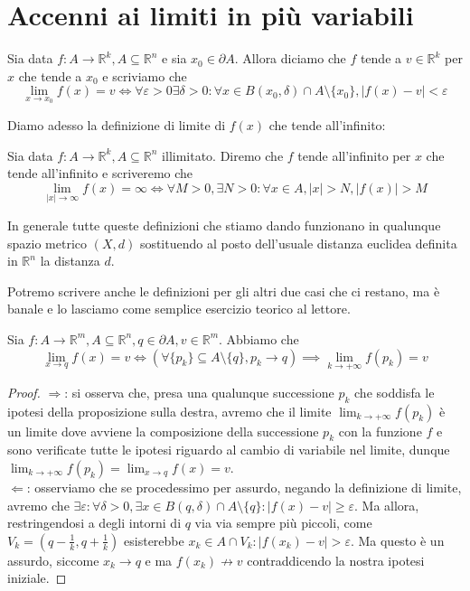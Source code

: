 \documentclass[openany, italian]{book}
\begin{document}
\section{Accenni ai limiti in più variabili}
\begin{definition}
Sia data $f: A \to \mathbb{R}^k, A \subseteq \mathbb{R}^n$ e sia $x_0 \in \partial A$. Allora diciamo che $f$ tende a $v \in \mathbb{R}^k$ per $x$ che tende a $x_0$ e scriviamo che
$$
\lim_{x \to x_0} f(x) = v \iff \forall \varepsilon > 0 \exists \delta > 0 : \forall x \in B(x_0, \delta) \cap A \setminus \{ x_0 \}, |f(x) - v| < \varepsilon
$$
\end{definition}
\noindent Diamo adesso la definizione di limite di $f(x)$ che tende all'infinito:
\begin{definition}
Sia data $f: A \to \mathbb{R}^k, A \subseteq \mathbb{R}^n$ illimitato. Diremo che $f$ tende all'infinito per $x$ che tende all'infinito e scriveremo che
$$
\lim_{|x| \to \infty} f(x) = \infty \iff \forall M > 0, \exists N > 0: \forall x \in A, |x| > N, |f(x)| > M
$$
\end{definition}
\begin{remark}
In generale tutte queste definizioni che stiamo dando funzionano in qualunque spazio metrico $(X,d)$ sostituendo al posto dell'usuale distanza euclidea definita in $\mathbb{R}^n$ la distanza $d$.
\end{remark}
\noindent Potremo scrivere anche le definizioni per gli altri due casi che ci restano, ma è banale e lo lasciamo come semplice esercizio teorico al lettore. \\
\begin{theorem}
Sia $f: A \to \mathbb{R}^m, A \subseteq \mathbb{R}^n, q \in \partial A, v \in \mathbb{R}^m$. Abbiamo che
$$
\lim_{x \to q} f(x) = v \iff (\forall \{ p_k \} \subseteq A \setminus \{ q \}, p_k \to q) \implies \lim_{k \to +\infty} f(p_k) = v
$$
\end{theorem}
\begin{proof} \hspace{1em} \newline
$\boxed{\Rightarrow}$: si osserva che, presa una qualunque successione $p_k$ che soddisfa le ipotesi della proposizione sulla destra, avremo che il limite $\lim_{k \to +\infty} f(p_k)$ è un limite dove avviene la composizione della successione $p_k$ con la funzione $f$ e sono verificate tutte le ipotesi riguardo al cambio di variabile nel limite, dunque $\lim_{k \to +\infty} f(p_k) = \lim_{x \to q} f(x) = v$. \\
$\boxed{\Leftarrow}$: osserviamo che se procedessimo per assurdo, negando la definizione di limite, avremo che $\exists \varepsilon: \forall \delta > 0, \exists x \in B(q, \delta) \cap A \setminus \{ q \}: |f(x) - v| \geq \varepsilon$. Ma allora, restringendosi a degli intorni di $q$ via via sempre più piccoli, come $V_k = (q-\frac{1}{k}, q + \frac{1}{k})$ esisterebbe $x_k \in A \cap V_k : |f(x_k) - v| > \varepsilon$. Ma questo è un assurdo, siccome $x_k \to q$ e ma $f(x_k) \not\to v$ contraddicendo la nostra ipotesi iniziale.
\end{proof}
\end{document}
